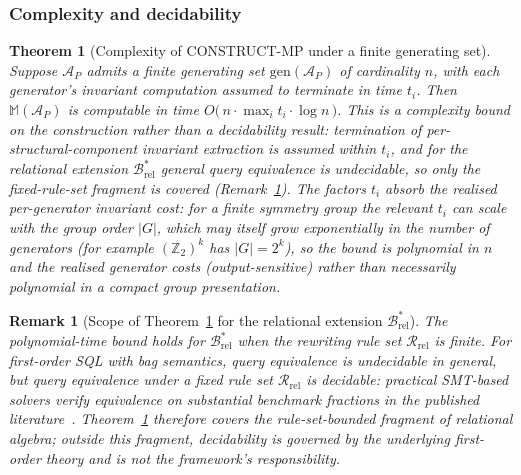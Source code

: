 \documentclass[acmsmall,screen,review]{acmart}
\newtheorem{theorem}{Theorem}
\newtheorem{remark}{Remark}
\begin{document}
\subsubsection{Complexity and decidability}
\label{subsec:decidability}

\begin{theorem}[Complexity of CONSTRUCT-MP under a finite generating set]
\label{thm:decidable}
Suppose $\mathcal{A}_P$ admits a finite generating set $\mathrm{gen}(\mathcal{A}_P)$ of cardinality $n$, with each generator's invariant computation \emph{assumed to terminate} in time $t_i$. Then $\mathbb{M}(\mathcal{A}_P)$ is computable in time $O\!\bigl(\,n \cdot \max_i t_i \cdot \log n\,\bigr)$. This is a complexity bound on the construction rather than a decidability result: termination of per-structural-component invariant extraction is assumed within $t_i$, and for the relational extension $\mathcal{B}^{*}_{\mathrm{rel}}$ general query equivalence is undecidable, so only the fixed-rule-set fragment is covered (Remark~\ref{rem:decidable-brel}). The factors $t_i$ absorb the realised per-generator invariant cost: for a finite symmetry group the relevant $t_i$ can scale with the group order $|G|$, which may itself grow exponentially in the number of generators (for example $(\mathbb{Z}_2)^{k}$ has $|G| = 2^{k}$), so the bound is polynomial in $n$ and the realised generator costs (output-sensitive) rather than necessarily polynomial in a compact group presentation.
\end{theorem}

\begin{remark}[Scope of Theorem~\ref{thm:decidable} for the relational extension $\mathcal{B}^{*}_{\mathrm{rel}}$]
\label{rem:decidable-brel}
The polynomial-time bound holds for $\mathcal{B}^{*}_{\mathrm{rel}}$ when the rewriting rule set $\mathcal{R}_{\mathrm{rel}}$ is finite. For first-order SQL with bag semantics, query equivalence is undecidable in general, but \emph{query equivalence under a fixed rule set $\mathcal{R}_{\mathrm{rel}}$} is decidable: practical SMT-based solvers verify equivalence on substantial benchmark fractions in the published literature~\cite{Wang2024QED, Zhou2022SPES}. Theorem~\ref{thm:decidable} therefore covers the rule-set-bounded fragment of relational algebra; outside this fragment, decidability is governed by the underlying first-order theory and is not the framework's responsibility.
\end{remark}
\end{document}
